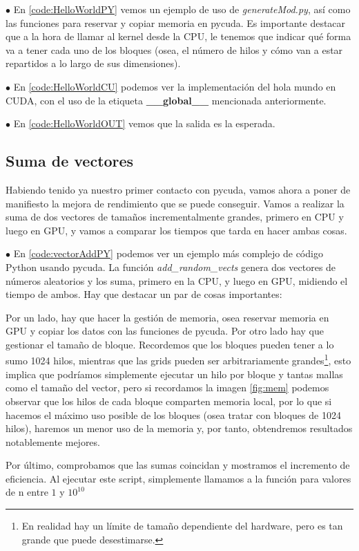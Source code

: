 $\bullet$ En \ref{code:HelloWorldPY} vemos un ejemplo de uso de \textit{generateMod.py}, así como las funciones para reservar y copiar memoria en pycuda. Es importante destacar que a la hora de llamar al kernel desde la CPU, le tenemos que indicar qué forma va a tener cada uno de los bloques (osea, el número de hilos y cómo van a estar repartidos a lo largo de sus dimensiones).

$\bullet$ En \ref{code:HelloWorldCU} podemos ver la implementación del hola mundo en \ac{CUDA}, con el uso de la etiqueta \textbf{\_\_global\_\_} mencionada anteriormente.

$\bullet$ En \ref{code:HelloWorldOUT} vemos que la salida es la esperada.

\subsection{Suma de vectores}
Habiendo tenido ya nuestro primer contacto con pycuda, vamos ahora a poner de manifiesto la mejora de rendimiento que se puede conseguir. Vamos a realizar la suma de dos vectores de tamaños incrementalmente grandes, primero en CPU y luego en GPU, y vamos a comparar los tiempos que tarda en hacer ambas cosas.

$\bullet$ En \ref{code:vectorAddPY} podemos ver un ejemplo más complejo de código Python usando pycuda. La función \textit{add\_random\_vects} genera dos vectores de números aleatorios y los suma, primero en la CPU, y luego en GPU, midiendo el tiempo de ambos. Hay que destacar un par de cosas importantes:

Por un lado, hay que hacer la gestión de memoria, osea reservar memoria en GPU y copiar los datos con las funciones de pycuda. Por otro lado hay que gestionar el tamaño de bloque. Recordemos que los bloques pueden tener a lo sumo 1024 hilos, mientras que las grids pueden ser arbitrariamente grandes\footnote{En realidad hay un límite de tamaño dependiente del hardware, pero es tan grande que puede desestimarse.}, esto implica que podríamos simplemente ejecutar un hilo por bloque y tantas mallas como el tamaño del vector, pero si recordamos la imagen \ref{fig:mem} podemos observar que los hilos de cada bloque comparten memoria local, por lo que si hacemos el máximo uso posible de los bloques (osea tratar con bloques de 1024 hilos), haremos un menor uso de la memoria y, por tanto, obtendremos resultados notablemente mejores.

Por último, comprobamos que las sumas coincidan y mostramos el incremento de eficiencia. Al ejecutar este script, simplemente llamamos a la función para valores de n entre $1$ y $10^{10}$


